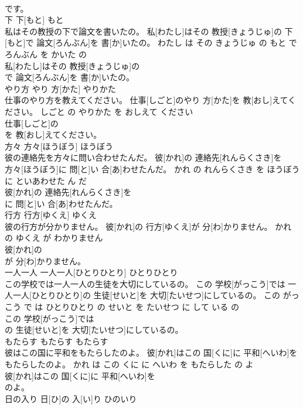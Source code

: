\documentclass[8pt]{extreport}
\begin{document}
\begin{CJK}{UTF8}{min}
\\	です。			
\\	下	下[もと]	もと	
\\	私はその教授の下で論文を書いたの。	私[わたし]はその 教授[きょうじゅ]の 下[もと]で 論文[ろんぶん]を 書[か]いたの。	わたし は その きょうじゅ の もと で ろんぶん を かいた の	
\\	私[わたし]はその 教授[きょうじゅ]の
\\	で 論文[ろんぶん]を 書[か]いたの。			
\\	やり方	やり 方[かた]	やりかた	
\\	仕事のやり方を教えてください。	仕事[しごと]のやり 方[かた]を 教[おし]えてください。	しごと の やりかた を おしえて ください	
\\	仕事[しごと]の
\\	を 教[おし]えてください。			
\\	方々	方々[ほうぼう]	ほうぼう	
\\	彼の連絡先を方々に問い合わせたんだ。	彼[かれ]の 連絡先[れんらくさき]を 方々[ほうぼう]に 問[と]い 合[あ]わせたんだ。	かれ の れんらくさき を ほうぼう に といあわせた ん だ	
\\	彼[かれ]の 連絡先[れんらくさき]を
\\	に 問[と]い 合[あ]わせたんだ。			
\\	行方	行方[ゆくえ]	ゆくえ	
\\	彼の行方が分かりません。	彼[かれ]の 行方[ゆくえ]が 分[わ]かりません。	かれ の ゆくえ が わかりません	
\\	彼[かれ]の
\\	が 分[わ]かりません。			
\\	一人一人	一人一人[ひとりひとり]	ひとりひとり	
\\	この学校では一人一人の生徒を大切にしているの。	この 学校[がっこう]では 一人一人[ひとりひとり]の 生徒[せいと]を 大切[たいせつ]にしているの。	この がっこう で は ひとりひとり の せいと を たいせつ に して いる の	
\\	この 学校[がっこう]では
\\	の 生徒[せいと]を 大切[たいせつ]にしているの。			
\\	もたらす	もたらす	もたらす	
\\	彼はこの国に平和をもたらしたのよ。	彼[かれ]はこの 国[くに]に 平和[へいわ]をもたらしたのよ。	かれ は この くに に へいわ を もたらした の よ	
\\	彼[かれ]はこの 国[くに]に 平和[へいわ]を
\\	のよ。			
\\	日の入り	日[ひ]の 入[い]り	ひのいり	

\end{CJK}
\end{document}
